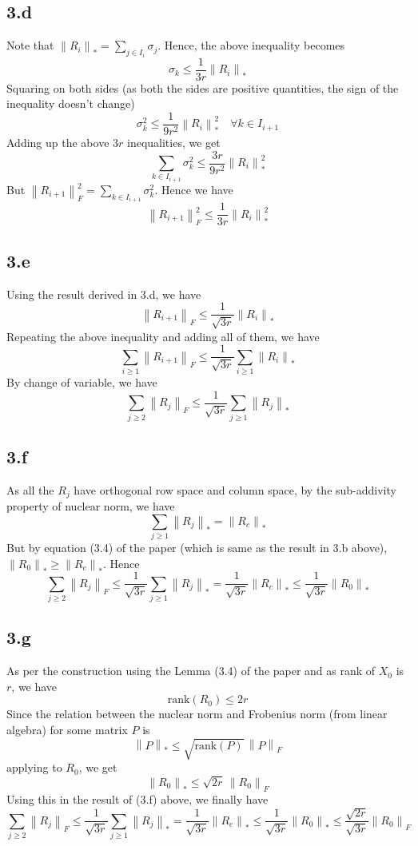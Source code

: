 \documentclass[12pt]{article}
\newcommand{\norm}[1]{\left\lVert #1 \right\rVert}
\begin{document}
\subsection*{3.d}
Note that $\norm{R_i}_* = \sum \limits_{j \in I_i}\sigma_j$. Hence, the above inequality becomes
$$\sigma_k \leq \frac{1}{3r}\norm{R_i}_*$$
Squaring on both sides (as both the sides are positive quantities, the sign of the inequality doesn't change)
$$\sigma_k^2 \leq \frac{1}{9r^2}\norm{R_i}_*^2 \quad \forall k \in I_{i+1}$$
Adding up the above $3r$ inequalities, we get
$$\sum\limits_{k \in I_{i+1}} \sigma_k^2 \leq \frac{3r}{9r^2}\norm{R_i}_*^2$$
But $\norm{R_{i+1}}_F^2 = \sum\limits_{k \in I_{i+1}} \sigma_k^2$. Hence we have
$$\norm{R_{i+1}}_F^2 \leq \frac{1}{3r}\norm{R_i}_*^2$$
\subsection*{3.e}
Using the result derived in 3.d, we have
$$\norm{R_{i+1}}_F \leq \frac{1}{\sqrt{3r}}\norm{R_i}_*$$
Repeating the above inequality and adding all of them, we have
$$\sum \limits_{i \geq 1}\norm{R_{i+1}}_F \leq \frac{1}{\sqrt{3r}}\sum \limits_{i \geq 1}\norm{R_i}_*$$
By change of variable, we have
$$\sum \limits_{j \geq 2}\norm{R_{j}}_F \leq \frac{1}{\sqrt{3r}}\sum \limits_{j \geq 1}\norm{R_j}_*$$
\subsection*{3.f}
As all the $R_j$ have orthogonal row space and column space, by the sub-addivity property of nuclear norm, we have
$$\sum \limits_{j \geq 1}\norm{R_j}_* = \norm{R_c}_*$$
But by equation (3.4) of the paper (which is same as the result in 3.b above), $\norm{R_0}_* \geq \norm{R_c}_*$. Hence
$$\sum \limits_{j \geq 2}\norm{R_{j}}_F \leq \frac{1}{\sqrt{3r}}\sum \limits_{j \geq 1}\norm{R_j}_* = \frac{1}{\sqrt{3r}} \norm{R_c}_* \leq \frac{1}{\sqrt{3r}} \norm{R_0}_*$$
\subsection*{3.g}
As per the construction using the Lemma (3.4) of the paper and as rank of $X_0$ is $r$, we have 
$$\text{rank}(R_0) \leq 2r$$
Since the relation between the nuclear norm and Frobenius norm (from linear algebra) for some matrix $P$ is
$$\norm{P}_* \leq \sqrt{\text{rank}(P)} \, \norm{P}_F$$
applying to $R_0$, we get
$$\norm{R_0}_* \leq \sqrt{2r} \, \norm{R_0}_F$$
Using this in the result of (3.f) above, we finally have
$$\sum \limits_{j \geq 2}\norm{R_{j}}_F \leq \frac{1}{\sqrt{3r}}\sum \limits_{j \geq 1}\norm{R_j}_* = \frac{1}{\sqrt{3r}} \norm{R_c}_* \leq \frac{1}{\sqrt{3r}} \norm{R_0}_* \leq \frac{\sqrt{2r}}{\sqrt{3r}}\norm{R_0}_F$$
\end{document}
